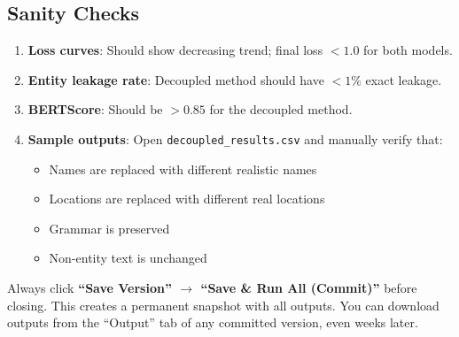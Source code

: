 \documentclass[11pt, a4paper]{article}
\begin{document}
\subsection{Sanity Checks}
\begin{enumerate}
    \item \textbf{Loss curves}: Should show decreasing trend; final loss $< 1.0$ for both models.
    \item \textbf{Entity leakage rate}: Decoupled method should have $< 1\%$ exact leakage.
    \item \textbf{BERTScore}: Should be $> 0.85$ for the decoupled method.
    \item \textbf{Sample outputs}: Open \texttt{decoupled\_results.csv} and manually verify that:
    \begin{itemize}
        \item Names are replaced with different realistic names
        \item Locations are replaced with different real locations
        \item Grammar is preserved
        \item Non-entity text is unchanged
    \end{itemize}
\end{enumerate}

\begin{tip}
Always click \textbf{``Save Version'' $\rightarrow$ ``Save \& Run All (Commit)''} before closing. This creates a permanent snapshot with all outputs. You can download outputs from the ``Output'' tab of any committed version, even weeks later.
\end{tip}
\end{document}
